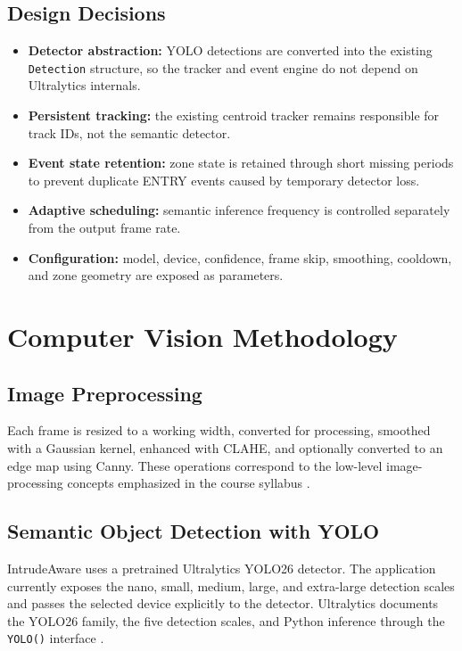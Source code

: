 \documentclass[12pt,a4paper]{report}
\newcommand{\code}[1]{\texttt{#1}}
\begin{document}
\section{Design Decisions}
\begin{itemize}[leftmargin=*]
  \item \textbf{Detector abstraction:} YOLO detections are converted into the existing \code{Detection} structure, so the tracker and event engine do not depend on Ultralytics internals.
  \item \textbf{Persistent tracking:} the existing centroid tracker remains responsible for track IDs, not the semantic detector.
  \item \textbf{Event state retention:} zone state is retained through short missing periods to prevent duplicate ENTRY events caused by temporary detector loss.
  \item \textbf{Adaptive scheduling:} semantic inference frequency is controlled separately from the output frame rate.
  \item \textbf{Configuration:} model, device, confidence, frame skip, smoothing, cooldown, and zone geometry are exposed as parameters.
\end{itemize}

\chapter{Computer Vision Methodology}
\section{Image Preprocessing}
Each frame is resized to a working width, converted for processing, smoothed with a Gaussian kernel, enhanced with CLAHE, and optionally converted to an edge map using Canny. These operations correspond to the low-level image-processing concepts emphasized in the course syllabus \cite{cse3010_syllabus}.

\section{Semantic Object Detection with YOLO}
IntrudeAware uses a pretrained Ultralytics YOLO26 detector. The application currently exposes the nano, small, medium, large, and extra-large detection scales and passes the selected device explicitly to the detector. Ultralytics documents the YOLO26 family, the five detection scales, and Python inference through the \code{YOLO()} interface \cite{ultralytics_yolo26}.
\end{document}
